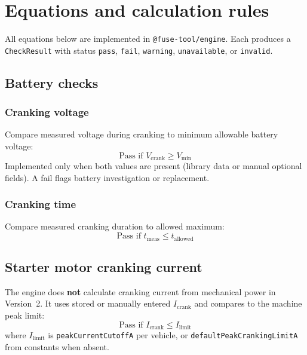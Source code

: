 \documentclass[11pt,a4paper]{report}
\begin{document}
\chapter{Equations and calculation rules}

All equations below are implemented in \texttt{@fuse-tool/engine}. Each produces a \texttt{CheckResult} with status \texttt{pass}, \texttt{fail}, \texttt{warning}, \texttt{unavailable}, or \texttt{invalid}.

\section{Battery checks}

\subsection{Cranking voltage}

Compare measured voltage during cranking to minimum allowable battery voltage:
\begin{equation}
  \text{Pass if } V_\mathrm{crank} \geq V_\mathrm{min}
\end{equation}
Implemented only when both values are present (library data or manual optional fields). A fail flags battery investigation or replacement.

\subsection{Cranking time}

Compare measured cranking duration to allowed maximum:
\begin{equation}
  \text{Pass if } t_\mathrm{meas} \leq t_\mathrm{allowed}
\end{equation}

\section{Starter motor cranking current}

The engine does \textbf{not} calculate cranking current from mechanical power in Version~2. It uses stored or manually entered $I_\mathrm{crank}$ and compares to the machine peak limit:
\begin{equation}
  \text{Pass if } I_\mathrm{crank} \leq I_\mathrm{limit}
\end{equation}
where $I_\mathrm{limit}$ is \texttt{peakCurrentCutoffA} per vehicle, or \texttt{defaultPeakCrankingLimitA} from constants when absent.
\end{document}
